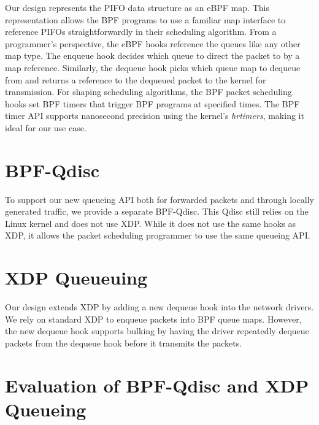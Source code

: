 \documentclass[sigconf, nonacm]{acmart}
\begin{document}
Our design represents the PIFO data structure as an eBPF map. This representation allows the BPF programs to use a familiar map interface to reference PIFOs straightforwardly in their scheduling algorithm. From a programmer's perspective, the eBPF hooks reference the queues like any other map type. The enqueue hook decides which queue to direct the packet to by a map reference. Similarly, the dequeue hook picks which queue map to dequeue from and returns a reference to the dequeued packet to the kernel for transmission. For shaping scheduling algorithms, the BPF packet scheduling hooks set BPF timers that trigger BPF programs at specified times. The BPF timer API supports nanosecond precision using the kernel's \textit{hrtimers}, making it ideal for our use case.


\section{BPF-Qdisc}


To support our new queueing API both for forwarded packets and through locally generated traffic, we provide a separate BPF-Qdisc. This Qdisc still relies on the Linux kernel and does not use XDP. While it does not use the same hooks as XDP, it allows the packet scheduling programmer to use the same queueing API.


\section{XDP Queueuing}


Our design extends XDP by adding a new dequeue hook into the network drivers. We rely on standard XDP to enqueue packets into BPF queue maps. However, the new dequeue hook supports bulking by having the driver repeatedly dequeue packets from the dequeue hook before it transmits the packets.


\section{Evaluation of BPF-Qdisc and XDP Queueing}
\end{document}
